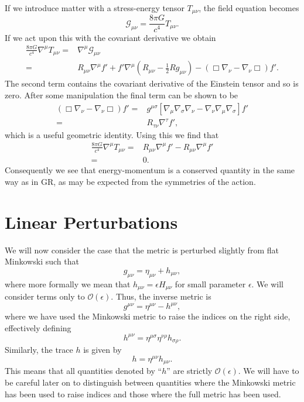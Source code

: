 \documentclass[a4paper, 11pt, titlepage, twoside]{report}
\newcommand{\recip}[1]{\ensuremath{\frac{1}{#1}}}
\newcommand{\order}[1]{\ensuremath{\mathcal{O}({#1})}}
\begin{document}
{If we introduce matter with a stress-energy tensor $T_{\mu\nu}$, the field equation becomes
\begin{equation}
\mathcal{G}_{\mu\nu} = \frac{8\pi G}{c^4}T_{\mu\nu}.
\end{equation}
If we act upon this with the covariant derivative we obtain
\begin{align}
\frac{8\pi G}{c^4}\nabla^\mu T_{\mu\nu} = {} & \nabla^\mu\mathcal{G}_{\mu\nu} \nonumber \\
= {} & R_{\mu\nu}\nabla^\mu f' + f'\nabla^\mu\left(R_{\mu\nu} - \recip{2}R g_{\mu\nu}\right) - \left(\Box\nabla_\nu - \nabla_\nu\Box\right)f'.
\end{align}
The second term contains the covariant derivative of the Einstein tensor and so is zero. After some manipulation the final term can be shown to be
\begin{align}
\left(\Box\nabla_\nu - \nabla_\nu\Box\right)f' = {} & g^{\mu\sigma}\left[\nabla_\mu\nabla_\sigma\nabla_\nu - \nabla_\nu\nabla_\mu\nabla_\sigma\right]f' \nonumber \\
 = {} & R_{\tau\nu}\nabla^\tau f',
\end{align}
which is a useful geometric identity. Using this we find that
\begin{align}
\frac{8\pi G}{c^4}\nabla^\mu T_{\mu\nu} = {} & R_{\mu\nu}\nabla^\mu f' - R_{\mu\nu}\nabla^\mu f' \nonumber \\
 = {} & 0.
\end{align}
Consequently we see that energy-momentum is a conserved quantity in the same way as in GR, as may be expected from the symmetries of the action.

\section{Linear Perturbations}\label{sec:Lin}

We will now consider the case that the metric is perturbed slightly from flat Minkowski such that
\begin{equation}
g_{\mu\nu} = \eta_{\mu\nu} + h_{\mu\nu},
\end{equation}
where more formally we mean that $h_{\mu\nu} = \epsilon H_{\mu\nu}$ for small parameter $\epsilon$. We will consider terms only to $\order{\epsilon}$. Thus, the inverse metric is
\begin{equation}
g^{\mu\nu} = \eta^{\mu\nu} - h^{\mu\nu},
\end{equation}
where we have used the Minkowski metric to raise the indices on the right side, effectively defining
\begin{equation}
h^{\mu\nu} = \eta^{\mu\sigma}\eta^{\nu\rho}h_{\sigma\rho}.
\end{equation}
Similarly, the trace $h$ is given by
\begin{equation}
h = \eta^{\mu\nu}h_{\mu\nu}.
\end{equation}
This means that all quantities denoted by ``$h$'' are strictly $\order{\epsilon}$. We will have to be careful later on to distinguish between quantities where the Minkowski metric has been used to raise indices and those where the full metric has been used.

}
\end{document}
